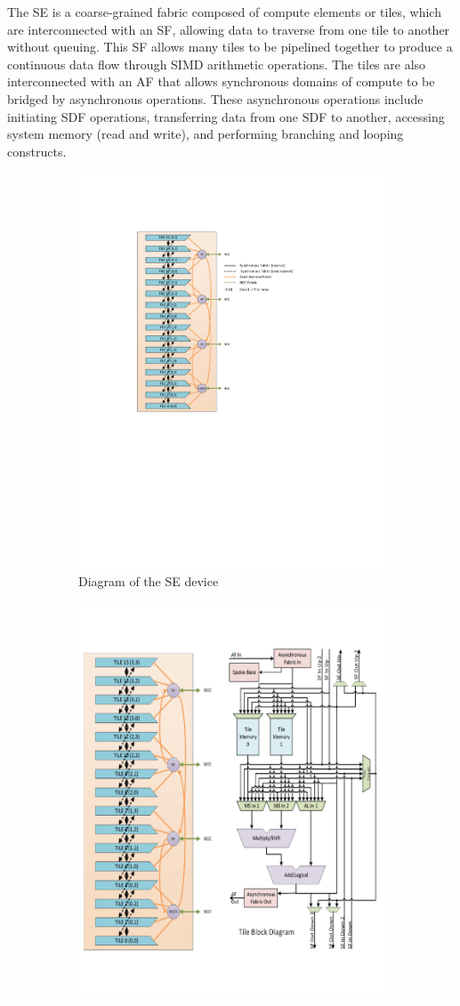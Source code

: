The SE is a coarse-grained fabric composed of compute elements or tiles, which are interconnected with an SF, allowing data to traverse from one tile to another without queuing.
This SF allows many tiles to be pipelined together to produce a continuous data flow through SIMD arithmetic operations.
The tiles are also interconnected with an AF that allows synchronous domains of compute to be bridged by asynchronous operations.
These asynchronous operations include initiating SDF operations, transferring data from one SDF to another, accessing system memory (read and write), and performing branching and looping constructs.

\begin{figure} [h]
  \begin{subfigure}{.5\textwidth}
    \centering
    \includegraphics[trim=118 310 180 110, clip, width=0.7\linewidth]{fig/se_device.pdf}
    \caption{Diagram of the SE device}
    \label{fig:sub-se}
    \end{subfigure}
  \begin{subfigure}{.5\textwidth}
  \centering
  \includegraphics[trim=300 100 8 50, clip, width=0.5\linewidth]{fig/se_device_tile.pdf}

\end{subfigure}
\end{figure}
